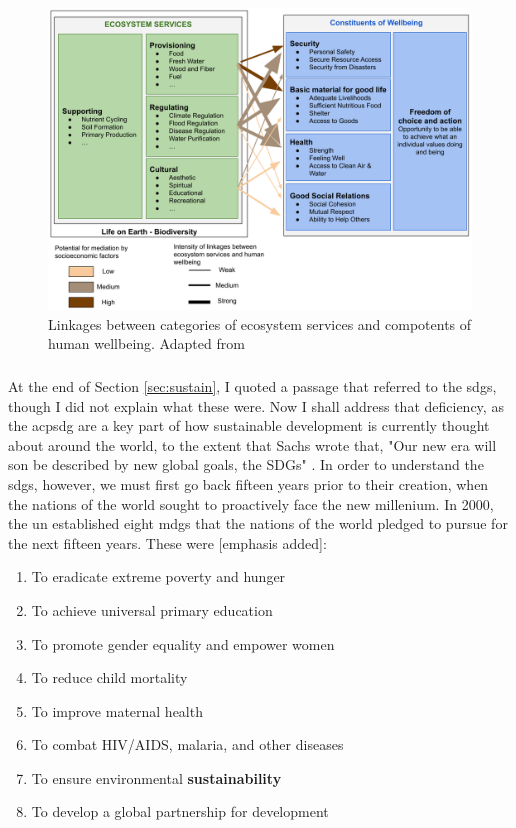 \begin{figure}[h]
	\centering
	\includegraphics[scale=0.35]{Figures/chap2/services_wellbeing.png}
	\caption[Linkages between categories of ecosystem services and compotents of human wellbeing]{Linkages between categories of ecosystem services and compotents of human wellbeing. Adapted from \cite{reidEcosystemsHumanWellbeing2005}}
	\label{fig:services_wellbeing}
\end{figure}

\subsubsection{}

At the end of Section \ref{sec:sustain}, I quoted a passage that referred to the \acp{sdg}, though I did not explain what these were. Now I shall address that deficiency, as the acp{sdg} are a key part of how sustainable development is currently thought about around the world, to the extent that Sachs wrote that, "Our new era will son be described by new global goals, the SDGs" \cite{sachsAgeSustainableDevelopment2015}. In order to understand the \acp{sdg}, however, we must first go back fifteen years prior to their creation, when the nations of the world sought to proactively face the new millenium. In 2000, the \ac{un} established eight \acp{mdg} that the nations of the world pledged to pursue for the next fifteen years. These were [emphasis added]:

\begin{enumerate} \setlength{\itemsep}{0pt} \setlength{\parskip}{0pt}
	\item To eradicate extreme poverty and hunger
	\item To achieve universal primary education
	\item To promote gender equality and empower women
	\item To reduce child mortality
	\item To improve maternal health
	\item To combat HIV/AIDS, malaria, and other diseases
	\item To ensure environmental \textbf{sustainability}
	\item To develop a global partnership for development
\end{enumerate}
    

